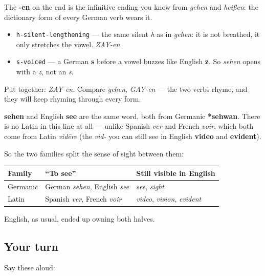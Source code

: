 The \textbf{-en} on the end is the infinitive ending you know from \emph{gehen} and \emph{heißen}: the dictionary form of every German verb wears it.

\begin{sounds}
\begin{itemize}
\raggedright
  \item \texttt{h-silent-lengthening} — the same silent \emph{h} as in \emph{gehen}: it is not breathed, it only stretches the vowel. \emph{ZAY-en}.
  \item \texttt{s-voiced} — a German \textbf{s} before a vowel buzzes like English \textbf{z}. So \emph{sehen} opens with a \emph{z}, not an \emph{s}.
\end{itemize}

Put together: \emph{ZAY-en}. Compare \emph{gehen}, \emph{GAY-en} — the two verbs rhyme, and they will keep rhyming through every form.
\end{sounds}

\begin{cousinweb}
\textbf{sehen} and English \textbf{see} are the same word, both from Germanic \textbf{*sehwan}. There is no Latin in this line at all — unlike Spanish \emph{ver} and French \emph{voir}, which both come from Latin \emph{vidēre} (the \emph{vid-} you can still see in English \textbf{video} and \textbf{evident}).

So the two families split the sense of sight between them:

\noindent
\begin{tabularx}{\linewidth}{@{}>{\raggedright\arraybackslash}X>{\raggedright\arraybackslash}X>{\raggedright\arraybackslash}X@{}}
\toprule
\textbf{Family} & \textbf{\textquotedblleft{}To see\textquotedblright{}} & \textbf{Still visible in English} \\
\midrule
Germanic & German \emph{sehen}, English \emph{see} & \emph{see}, \emph{sight} \\
Latin & Spanish \emph{ver}, French \emph{voir} & \emph{video}, \emph{vision}, \emph{evident} \\
\bottomrule
\end{tabularx}

English, as usual, ended up owning both halves.
\end{cousinweb}

\subsection*{Your turn}
Say these aloud:

